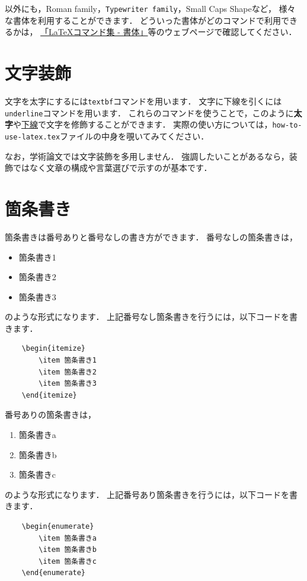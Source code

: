 \documentclass{simplepaper}
\begin{document}

以外にも，{\rm Roman family}，{\tt Typewriter family}，{\sc Small Caps Shape}など，
様々な書体を利用することができます．
どういった書体がどのコマンドで利用できるかは，
\href{http://www.latex-cmd.com/style/style.html}{「LaTeXコマンド集 - 書体」}等のウェブページで確認してください．


\section{文字装飾}
文字を太字にするには\texttt{textbf}コマンドを用います．
文字に下線を引くには\texttt{underline}コマンドを用います．
これらのコマンドを使うことで，このように\textbf{太字}や\underline{下線}で文字を修飾することができます．
実際の使い方については，\texttt{how-to-use-latex.tex}ファイルの中身を覗いてみてください．

なお，学術論文では文字装飾を多用しません．
強調したいことがあるなら，装飾ではなく文章の構成や言葉選びで示すのが基本です．


\section{箇条書き}
箇条書きは番号ありと番号なしの書き方ができます．
番号なしの箇条書きは，
\begin{itemize}
\item 箇条書き1
\item 箇条書き2
\item 箇条書き3
\end{itemize}
のような形式になります．
上記番号なし箇条書きを行うには，以下コードを書きます．
\begin{verbatim}
    \begin{itemize}
        \item 箇条書き1
        \item 箇条書き2
        \item 箇条書き3
    \end{itemize}
\end{verbatim}

番号ありの箇条書きは，
\begin{enumerate}
\item 箇条書きa
\item 箇条書きb
\item 箇条書きc
\end{enumerate}
のような形式になります．
上記番号あり箇条書きを行うには，以下コードを書きます．
\begin{verbatim}
    \begin{enumerate}
        \item 箇条書きa
        \item 箇条書きb
        \item 箇条書きc
    \end{enumerate}
\end{verbatim}
\end{document}
